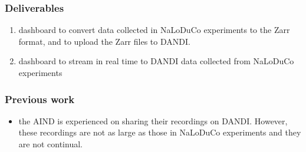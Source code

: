 
\begin{frame}
    \frametitle{Deliverables}

    \begin{enumerate}

        \item dashboard to convert data collected in NaLoDuCo experiments to the Zarr format, and to upload the Zarr files to DANDI.

        \item dashboard to stream in real time to DANDI data collected from NaLoDuCo experiments

\end{enumerate}

\end{frame}

\begin{frame}
    \frametitle{Previous work}

    \begin{itemize}

        \item the AIND is experienced on sharing their recordings on DANDI.
        However, these recordings are not as large as those in NaLoDuCo
        experiments and they are not continual.

\end{itemize}

\end{frame}

